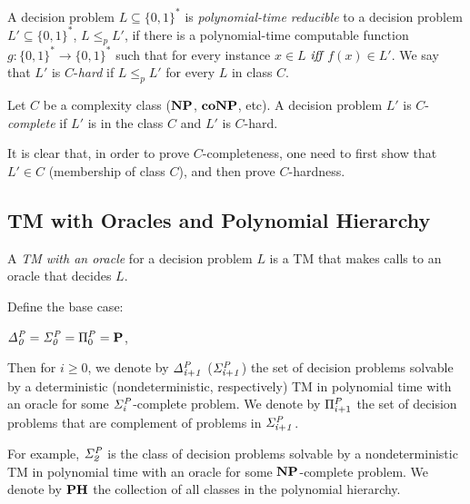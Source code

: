 \begin{definition}
	A decision problem $L \subseteq \{0,1\}^*$  is \textit{polynomial-time reducible} to
	a decision problem $L' \subseteq \{0,1\}^*$, $L \leq_p L'$, if there is a
	polynomial-time computable function $g : \{0,1\}^* \rightarrow \{0,1\}^*$
	such that for every instance $x \in L$ $\textit{iff}$ $f(x) \in L'$.
	We say that $L'$ is $C$-\textit{hard} if $L \leq_p L'$ for every $L$ in class $C$.
\end{definition}


\begin{definition}
	Let $C$ be a complexity class ($\textbf{NP}$, $\textbf{coNP}$, etc).
	A decision problem $L'$ is $C$-\textit{complete} if $L'$ is in the class 
	$C$ and $L'$ is $C$-hard.
\end{definition}
It is clear that, in order to prove $C$-completeness, one need to first show
that $L' \in C$ (membership of class $C$), and then prove $C$-hardness.



\subsection{TM with Oracles and Polynomial Hierarchy}
A \textit{TM with an oracle} for a decision problem $L$ is a TM that makes calls 
to an oracle that decides $L$.

\begin{definition}
	Define the base case:
	\begin{center}
		$\mathit{\Delta^P_{0}} = \mathit{\Sigma^P_{0}} = \Pi^P_{0} = \textbf{P}$,
	\end{center}
	Then for $i \geq 0$, we denote by $\mathit{\Delta^P_{i+1}}$ ($\mathit{\Sigma^P_{i+1}}$) 
	the set of decision problems solvable
	by a deterministic (nondeterministic, respectively) TM 
	in polynomial time with an oracle for some $\mathit{\Sigma^P_{i}}$-complete problem.
	We denote by $\Pi^P_{i+1}$ the set of decision problems that are complement
	of problems in $\mathit{\Sigma^P_{i+1}}$.
\end{definition}
For example, $\mathit{\Sigma^P_{2}}$ is the class of decision problems solvable by a nondeterministic
TM in polynomial time with an oracle for some $\textbf{NP}$-complete problem.
We denote by $\textbf{PH}$ the collection of all classes in the polynomial hierarchy.

